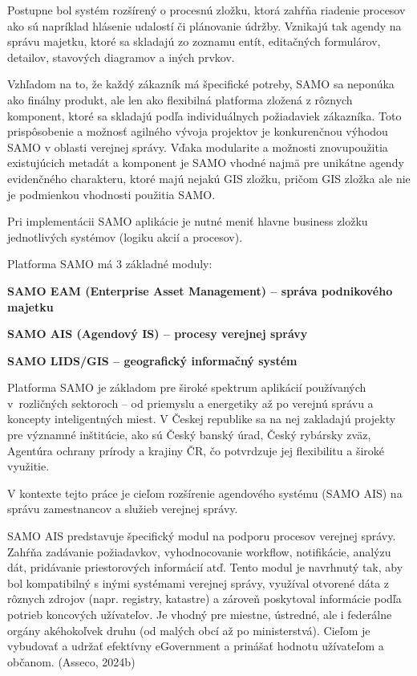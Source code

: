 Postupne bol systém rozšírený o procesnú zložku, ktorá zahŕňa riadenie procesov ako sú napríklad hlásenie udalostí či plánovanie údržby. Vznikajú tak agendy na správu majetku, ktoré sa skladajú zo zoznamu entít, editačných formulárov, detailov, stavových diagramov a iných prvkov. 

Vzhľadom na to, že každý zákazník má špecifické potreby, SAMO sa neponúka ako finálny produkt, ale len ako flexibilná platforma zložená z rôznych komponent, ktoré sa skladajú podľa individuálnych požiadaviek zákazníka. Toto prispôsobenie a možnosť agilného vývoja projektov je konkurenčnou výhodou SAMO v oblasti verejnej správy. Vďaka modularite a možnosti znovupoužitia existujúcich metadát a komponent je SAMO vhodné najmä pre unikátne agendy evidenčného charakteru, ktoré majú nejakú GIS zložku, pričom GIS zložka ale nie je podmienkou vhodnosti použitia SAMO. 

Pri implementácii SAMO aplikácie je nutné meniť hlavne business zložku jednotlivých systémov (logiku akcií a procesov).

\blank
Platforma SAMO má 3 základné moduly:

\startitemize
\item \start\bf SAMO EAM \stop (Enterprise Asset Management) --  správa podnikového majetku
\item \start\bf SAMO AIS \stop (Agendový IS) -- procesy verejnej správy
\item  \start\bf SAMO LIDS/GIS \stop -- geografický informačný systém
\stopitemize

Platforma SAMO je základom pre široké spektrum aplikácií používaných v~rozličných sektoroch – od priemyslu a energetiky až po verejnú správu a koncepty inteligentných miest. V Českej republike sa na nej zakladajú projekty pre významné inštitúcie, ako sú Český banský úrad, Český rybársky zväz, Agentúra ochrany prírody a krajiny ČR, čo potvrdzuje jej flexibilitu a široké využitie.


V kontexte tejto práce je cieľom rozšírenie agendového systému (SAMO AIS) na správu zamestnancov a služieb verejnej správy.

SAMO AIS predstavuje špecifický modul na podporu procesov verejnej správy. Zahŕňa zadávanie požiadavkov, vyhodnocovanie workflow, notifikácie, analýzu dát, pridávanie priestorových informácií atď. Tento modul je navrhnutý tak, aby bol kompatibilný s inými systémami verejnej správy, využíval otvorené dáta z rôznych zdrojov (napr. registry, katastre) a zároveň poskytoval informácie podľa potrieb koncových užívateľov. Je vhodný pre miestne, ústredné, ale i federálne orgány akéhokoľvek druhu (od malých obcí až po ministerstvá). Cieľom je vybudovať a udržať efektívny eGovernment a prinášať hodnotu užívateľom a občanom. \scr(Asseco, 2024b)

